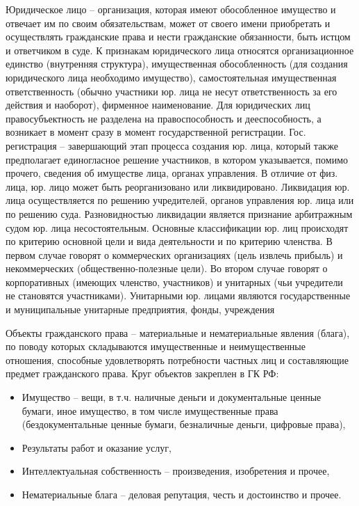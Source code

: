 \documentclass[a4paper, 12pt]{article}
\begin{document}
Юридическое лицо -- организация, которая имеют обособленное имущество и отвечает им по своим обязательствам, может от своего имени приобретать и осуществлять гражданские права и нести гражданские обязанности, быть истцом и ответчиком в суде. 
К признакам юридического лица относятся организационное единство (внутренняя структура), имущественная обособленность (для создания юридического лица необходимо имущество), самостоятельная имущественная ответственность (обычно участники юр. лица не несут ответственность за его действия и наоборот), фирменное наименование. 
Для юридических лиц правосубъектность не разделена на правоспособность и дееспособность, а возникает в момент сразу в момент государственной регистрации. 
Гос. регистрация -- завершающий этап процесса создания юр. лица, который также предполагает единогласное решение участников, в котором указывается, помимо прочего, сведения об имуществе лица, органах управления. 
В отличие от физ. лица, юр. лицо может быть реорганизовано или ликвидировано. 
Ликвидация юр. лица осуществляется по решению учредителей, органов управления юр. лица или по решению суда. 
Разновидностью ликвидации является признание арбитражным судом юр. лица несостоятельным. 
Основные классификации юр. лиц происходят по критерию основной цели и вида деятельности и по критерию членства. 
В первом случае говорят о коммерческих организациях (цель извлечь прибыль) и некоммерческих (общественно-полезные цели).
Во втором случае говорят о корпоративных (имеющих членство, участников) и унитарных (чьи учредители не становятся участниками). 
Унитарными юр. лицами являются государственные и муниципальные унитарные предприятия, фонды, учреждения 

Объекты гражданского права -- материальные и нематериальные явления (блага), по поводу которых складываются имущественные и неимущественные отношения, способные удовлетворять потребности частных лиц и составляющие предмет гражданского права. 
Круг объектов закреплен в ГК РФ:
\begin{itemize}
\item Имущество -- вещи, в т.ч. наличные деньги и документальные ценные бумаги, иное имущество, в том числе имущественные права (бездокументальные ценные бумаги, безналичные деньги, цифровые права),
\item Результаты работ и оказание услуг,
\item Интеллектуальная собственность -- произведения, изобретения и прочее,
\item Нематериальные блага -- деловая репутация, честь и достоинство и прочее. 
\end{itemize}
\end{document}
